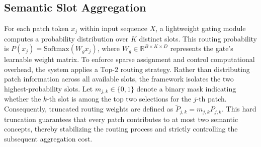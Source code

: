 \documentclass[runningheads]{llncs}
\begin{document}




\subsection{Semantic Slot Aggregation}
For each patch token $x_j$ within input sequence $X$, a lightweight gating module computes a probability distribution over $K$ distinct slots. This routing probability is $P(x_j) = \mathrm{Softmax}(W_g x_j)$, where $W_g \in \mathbb{R}^{B \times K \times D}$ represents the gate's learnable weight matrix. To enforce sparse assignment and control computational overhead, the system applies a Top-2 routing strategy. Rather than distributing patch information across all available slots, the framework isolates the two highest-probability slots. Let $m_{j,k} \in \{0, 1\}$ denote a binary mask indicating whether the $k$-th slot is among the top two selections for the $j$-th patch. Consequently, truncated routing weights are defined as $\tilde{P}_{j,k} = m_{j,k} P_{j,k}$. This hard truncation guarantees that every patch contributes to at most two semantic concepts, thereby stabilizing the routing process and strictly controlling the subsequent aggregation cost.
\end{document}
